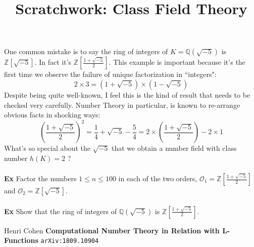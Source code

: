 \documentclass[12pt]{article}
\title{Scratchwork: Class Field Theory}
\date{}
\begin{document}
\sffamily

\maketitle

\noindent One common mistake is to say the ring of integers of $K =  \mathbb{Q}(\sqrt{-5})$ is $\mathbb{Z}[\sqrt{-5}]$.  In fact it's $\mathbb{Z}[\frac{1+\sqrt{-5}}{2}]$. This example is important because it's the first time we observe the failure of unique factorization in ``integers":
$$2 \times 3 = (1 + \sqrt{-5}) \times (1 - \sqrt{-5}) $$
Despite being quite well-known, I feel this is the kind of result that needs to be checked very carefully.  Number Theory in particular, is known to re-arrange obvious facts in shocking ways:
$$ \left( \frac{1 + \sqrt{-5}}{2} \right)^2 = \frac{1}{4} + \sqrt{-5} - \frac{5}{4} 
= 2 \times \left( \frac{1 + \sqrt{-5}}{2} \right) - 2 \times 1$$
What's so special about the $\sqrt{-5}$ that we obtain a number field with class number $h(K)=2$ ? \\ \\
\textbf{Ex} Factor the numbers $1 \leq n \leq 100$ in each of the two orders, $\mathcal{O}_1 = \mathbb{Z}\left[ \frac{1 + \sqrt{-5}}{2}\right]$ and $\mathcal{O}_2 = \mathbb{Z}[\sqrt{-5}]$. \\ \\
\textbf{Ex} Show that the ring of integers of $\mathbb{Q}(\sqrt{-5})$ is $\mathbb{Z}\left[ \frac{1 + \sqrt{-5}}{2}\right]$.
\vfill
\begin{thebibliography}{}

\item Henri Cohen \textbf{Computational Number Theory in Relation with L-Functions} \texttt{arXiv:1809.10904}

\end{thebibliography}
\end{document}
